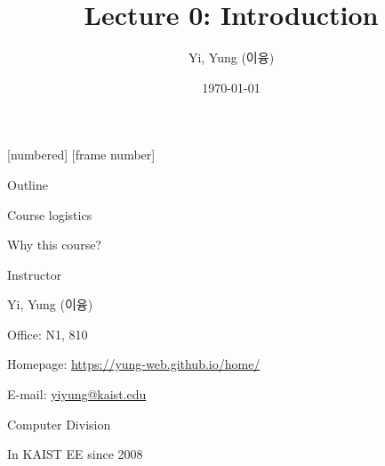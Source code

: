 
\csname\pdfmode\endcsname

{
  [numbered]
  [frame number]  %
}



\title[]{Lecture 0: Introduction}
\author{Yi, Yung (이융)}
\date{\today}








\begin{frame}
  \titlepage
\end{frame}


\begin{frame}{Outline}

\bci
\item Course logistics

\item Why this course?
\eci
\end{frame}


\begin{frame}{Instructor}

\bci
\item Yi, Yung (이융)
\item Office: N1, 810
\item Homepage: \url{https://yung-web.github.io/home/}
\item E-mail: \url{yiyung@kaist.edu}
\item Computer Division
\item In KAIST EE since 2008


\eci

\end{frame}

